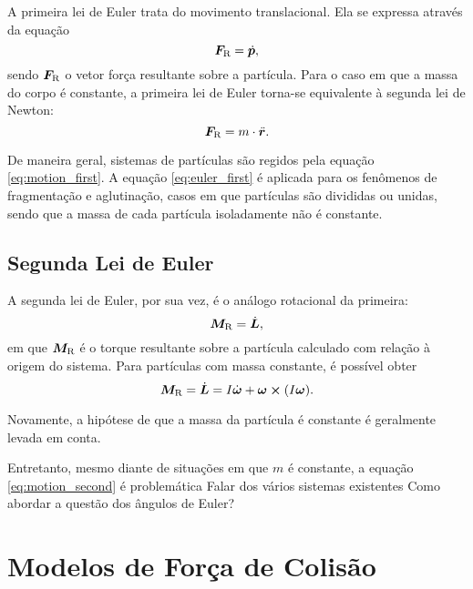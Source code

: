 A primeira lei de Euler trata do movimento translacional. Ela se expressa através da equação
\begin{equation} \label{eq:euler_first}
	\resultingForce = \deriv{1}{\linearMomentum},
\end{equation}
sendo \(\bm{F}_{\text{R}}\) o vetor força resultante sobre a partícula. Para o caso em que a massa do corpo é constante, a primeira lei de Euler torna-se equivalente à segunda lei de Newton:
\begin{equation} \label{eq:motion_first}
	\resultingForce = \mass\cdot\acceleration.
\end{equation}

De maneira geral, sistemas de partículas são regidos pela equação \eqref{eq:motion_first}. A equação \eqref{eq:euler_first} é aplicada para os fenômenos de fragmentação e aglutinação, casos em que partículas são divididas ou unidas, sendo que a massa de cada partícula isoladamente não é constante.

\subsection{Segunda Lei de Euler}

A segunda lei de Euler, por sua vez, é o análogo rotacional da primeira:
\begin{equation*} %
	\resultingTorque = \deriv{1}{\angularMomentum},
\end{equation*}
em que \(\bm{M}_{\text{R}}\) é o torque resultante sobre a partícula calculado com relação à origem do sistema. Para partículas com massa constante, é possível obter
\begin{equation} \label{eq:motion_second}
	\resultingTorque = \deriv{1}{\angularMomentum} = \momentOfInertia\deriv{1}{\angularVelocity} + \angularVelocity\cross\pqty{\momentOfInertia\angularVelocity}.
\end{equation}

Novamente, a hipótese de que a massa da partícula é constante é geralmente levada em conta. 

Entretanto, mesmo diante de situações em que \(m\) é constante, a equação \eqref{eq:motion_second} é problemática
\alert{Falar dos vários sistemas existentes}
\alert{Como abordar a questão dos ângulos de Euler?}

\section{Modelos de Força de Colisão}


